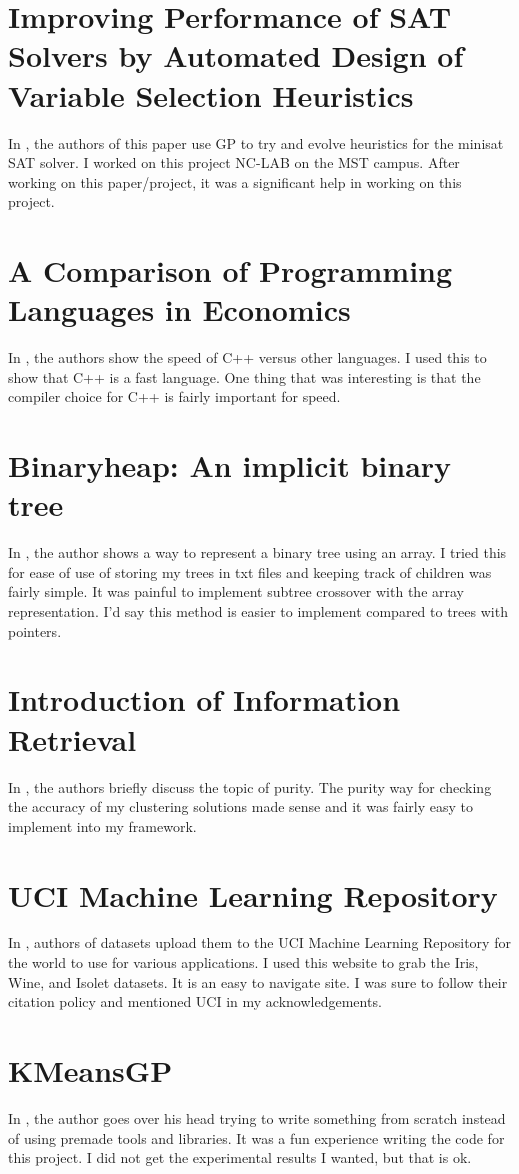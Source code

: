 \documentclass[conference]{IEEEtran}
\begin{document}
\section{Improving Performance of SAT Solvers by Automated Design of Variable Selection Heuristics}
In \cite{Illetskova2017},  the authors of this paper use GP to try and evolve heuristics for the minisat SAT solver.  I worked on this project NC-LAB on the MST campus.  After working on this paper/project, it was a significant help in working on this project.  

\section{A Comparison of Programming Languages in Economics}
In \cite{Aruboa2014}, the authors show the speed of C++ versus other languages.  I used this to show that C++ is a fast language.  One thing that was interesting is that the compiler choice for C++ is fairly important for speed.

\section{Binaryheap: An implicit binary tree}
In \cite{HodaNima}, the author shows a way to represent a binary tree using an array.  I tried this for ease of use of storing my trees in txt files and keeping track of children was fairly simple.  It was painful to implement subtree crossover with the array representation.  I'd say this method is easier to implement compared to trees with pointers.

\section{Introduction of Information Retrieval}
In \cite{Manning2008}, the authors briefly discuss the topic of purity.  The purity way for checking the accuracy of my clustering solutions made sense and it was fairly easy to implement into my framework.

\section{UCI Machine Learning Repository}
In \cite{Dua:2017}, authors of datasets upload them to the UCI Machine Learning Repository for the world to use for various applications.  I used this website to grab the Iris, Wine, and Isolet datasets.  It is an easy to navigate site.  I was sure to follow their citation policy and mentioned UCI in my acknowledgements.  

\section{KMeansGP}
In \cite{KMeansGP}, the author goes over his head trying to write something from scratch instead of using premade tools and libraries.  It was a fun experience writing the code for this project.  I did not get the experimental results I wanted, but that is ok.  

\clearpage



 
\end{document}
